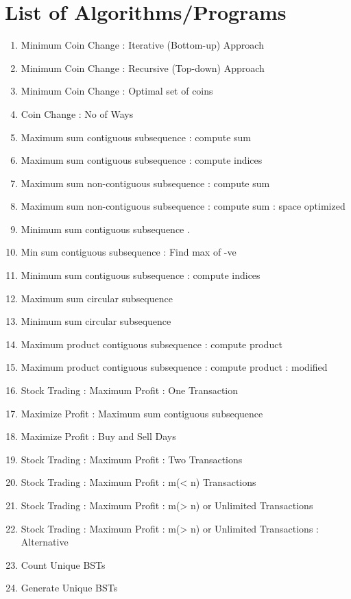 \section*{List of Algorithms/Programs}
\begin{enumerate}[noitemsep]
    \item Minimum Coin Change : Iterative (Bottom-up) Approach 
    \item Minimum Coin Change : Recursive (Top-down) Approach 
    \item Minimum Coin Change : Optimal set of coins 
    \item Coin Change : No of Ways 
    \item Maximum sum contiguous subsequence : compute sum
    \item Maximum sum contiguous subsequence : compute indices 
    \item Maximum sum non-contiguous subsequence : compute sum 
    \item Maximum sum non-contiguous subsequence : compute sum : space optimized
    \item Minimum sum contiguous subsequence .
    \item Min sum contiguous subsequence : Find max of -ve 
    \item Minimum sum contiguous subsequence : compute indices 
    \item Maximum sum circular subsequence 
    \item Minimum sum circular subsequence 
    \item Maximum product contiguous subsequence : compute product 
    \item Maximum product contiguous subsequence : compute product : modified 
    \item Stock Trading : Maximum Proﬁt : One Transaction 
    \item Maximize Proﬁt : Maximum sum contiguous subsequence
    \item Maximize Proﬁt : Buy and Sell Days 
    \item Stock Trading : Maximum Proﬁt : Two Transactions 
    \item Stock Trading : Maximum Proﬁt : m(< n) Transactions 
    \item Stock Trading : Maximum Proﬁt : m(> n) or Unlimited Transactions 
    \item Stock Trading : Maximum Proﬁt : m(> n) or Unlimited Transactions : Alternative
    \item Count Unique BSTs 
    \item Generate Unique BSTs

\end{enumerate}
